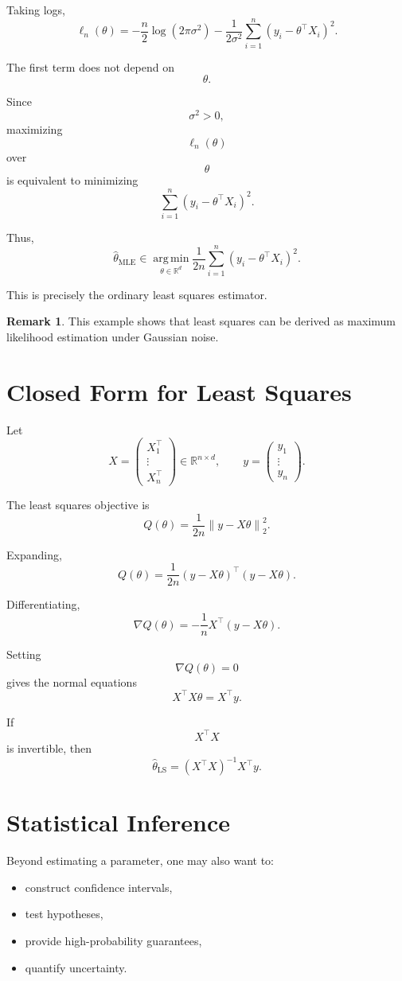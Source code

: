 \documentclass[12pt,oneside]{book}
\numberwithin{equation}{section}
\theoremstyle{definition}
\newtheorem{remark}{Remark}[section]
\theoremstyle{plain}
\theoremstyle{remark}
\newcommand{\R}{\mathbb{R}}
\newcommand{\argmin}{\operatorname*{arg\,min}}
\newcommand{\norm}[1]{\left\lVert #1 \right\rVert}
\begin{document}
Taking logs,
\[
\ell_n(\theta)
=
-\frac{n}{2}\log(2\pi\sigma^2)
-
\frac{1}{2\sigma^2}
\sum_{i=1}^n
(y_i-\theta^\top X_i)^2.
\]

The first term does not depend on
\[
\theta.
\]

Since
\[
\sigma^2>0,
\]
maximizing
\[
\ell_n(\theta)
\]
over
\[
\theta
\]
is equivalent to minimizing
\[
\sum_{i=1}^n
(y_i-\theta^\top X_i)^2.
\]

Thus,
\[
\widehat{\theta}_{\mathrm{MLE}}
\in
\argmin_{\theta\in\R^d}
\frac{1}{2n}
\sum_{i=1}^n
(y_i-\theta^\top X_i)^2.
\]

This is precisely the ordinary least squares estimator.

\begin{remark}
This example shows that least squares can be derived as maximum likelihood estimation under Gaussian noise.
\end{remark}

\section{Closed Form for Least Squares}

Let
\[
X
=
\begin{pmatrix}
X_1^\top\\
\vdots\\
X_n^\top
\end{pmatrix}
\in\R^{n\times d},
\qquad
y
=
\begin{pmatrix}
y_1\\
\vdots\\
y_n
\end{pmatrix}.
\]

The least squares objective is
\[
Q(\theta)
=
\frac{1}{2n}\norm{y-X\theta}_2^2.
\]

Expanding,
\[
Q(\theta)
=
\frac{1}{2n}
(y-X\theta)^\top(y-X\theta).
\]

Differentiating,
\[
\nabla Q(\theta)
=
-\frac{1}{n}X^\top(y-X\theta).
\]

Setting
\[
\nabla Q(\theta)=0
\]
gives the normal equations
\[
X^\top X\theta=X^\top y.
\]

If
\[
X^\top X
\]
is invertible, then
\[
\widehat{\theta}_{\mathrm{LS}}
=
(X^\top X)^{-1}X^\top y.
\]

\section{Statistical Inference}

Beyond estimating a parameter, one may also want to:
\begin{itemize}
\item construct confidence intervals,
\item test hypotheses,
\item provide high-probability guarantees,
\item quantify uncertainty.
\end{itemize}
\end{document}

